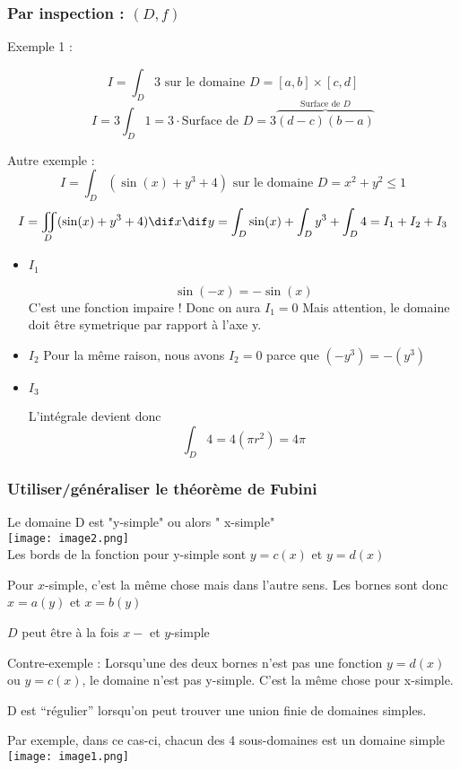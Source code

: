 \subsubsection{Par inspection : $(D,f)$}
Exemple 1 :

\[I=\int_D 3 \text{ sur le domaine }D=[a,b]\times[c,d]\]
\[I=3\int_D 1 = 3 \cdot \text{Surface de }D = 3\overbrace{(d-c)(b-a)}^{\text{Surface de }D} \]

Autre exemple :
\[I = \int_D ( \sin(x) +y^3 + 4 )\text{ sur le domaine } D=x^2+y^2\le 1\]
\[I = \iint_D(\sin(x)+y^3+4)\dif x\dif y = \int_D \sin(x) + \int_D y^3 + \int_D 4 = I_1 + I_2 + I_3\]
\begin{itemize}

\item \textbf{$I_1$}




\[\sin(-x) = -\sin(x) \]
C'est une fonction impaire !
Donc on aura \emph{$I_1=0$}
Mais attention, le domaine doit être symetrique par rapport à l'axe y.
\item \textbf{$I_2$}
Pour la même raison, nous avons $I_2=0$ parce que $(-y^3) = -(y^3)$

\item \textbf{$I_3$}

L'intégrale devient donc
\[\int_D 4 = 4(\pi r^2) = 4\pi \]

\end{itemize}
\subsubsection{Utiliser/généraliser le théorème de Fubini}

Le domaine D est "y-simple" ou alors " x-simple"\\
\texttt{[image: image2.png]}
\\
Les bords de la fonction pour y-simple sont $y=c(x)$ et $y=d(x)$

Pour $x$-simple, c'est la même chose mais dans l'autre sens. Les bornes sont donc $x=a(y)$ et $x=b(y)$
\begin{myrem}
$D$ peut être à la fois $x-$ et $y$-simple
\end{myrem}
\begin{myrem}
Contre-exemple : Lorsqu'une des deux bornes n'est pas une fonction $y=d(x)$ ou $y=c(x)$, le domaine n'est pas y-simple. C'est la même chose pour x-simple.

\end{myrem}

\begin{myrem}
D est ``régulier'' lorsqu'on peut trouver une union finie de domaines simples.


Par exemple, dans ce cas-ci, chacun des 4 sous-domaines est un domaine simple\\
\texttt{[image: image1.png]}

\end{myrem}
